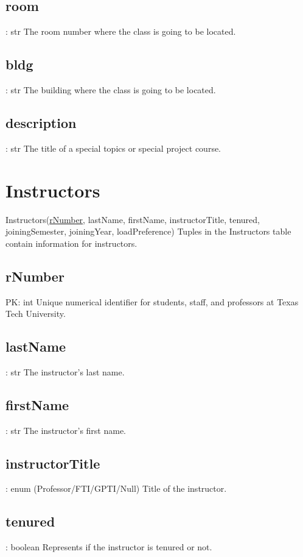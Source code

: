 	\subsection{room}
		: str
		The room number where the class is going to be located.
		    	
	\subsection{bldg}
		: str
		The building where the class is going to be located.
		
	\subsection{description}
		: str
		The title of a special topics or special project course.
		    


\section{Instructors}
	Instructors(\underline{rNumber}, lastName, firstName, instructorTitle, tenured, joiningSemester, joiningYear, loadPreference) 
		Tuples in the Instructors table contain information for instructors.
	
	\subsection{rNumber}
		PK: int
		Unique numerical identifier for students, staff, and professors at Texas Tech University.
    
    \subsection{lastName}
		: str  
    	The instructor's last name.
    
    \subsection{firstName}
    	: str 
    	The instructor's first name.
  
    \subsection{instructorTitle}
    	: enum (Professor/FTI/GPTI/Null)
    	Title of the instructor.
    
    \subsection{tenured}    
    	: boolean 
    	Represents if the instructor is tenured or not.
    
